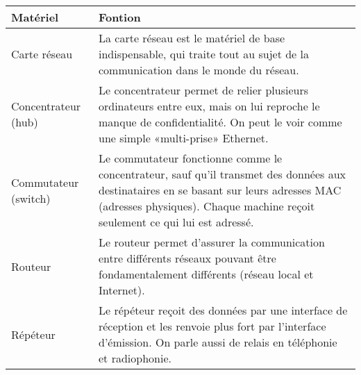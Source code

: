 \begin{tabular}{l|p{}}
  \textbf{Matériel} & \textbf{Fontion} \\\hline
  Carte réseau & La carte réseau est le matériel de base indispensable, qui traite tout au sujet de la communication dans le monde du réseau.\\\hline

Concentrateur (hub) & Le concentrateur permet de relier plusieurs ordinateurs entre eux, mais on lui reproche le manque de confidentialité. On peut le voir comme une simple «multi-prise» Ethernet. \\\hline

Commutateur (switch) & Le commutateur fonctionne comme le concentrateur, sauf qu'il transmet des données aux destinataires en se basant sur leurs adresses MAC (adresses physiques). Chaque machine reçoit seulement ce qui lui est adressé.\\\hline

Routeur & Le routeur permet d'assurer la communication entre différents réseaux pouvant être fondamentalement différents (réseau local et Internet).\\\hline

Répéteur& Le répéteur reçoit des données par une interface de réception et les renvoie plus fort par l'interface d'émission. On parle aussi de relais en téléphonie et radiophonie.\\
\end{tabular}
